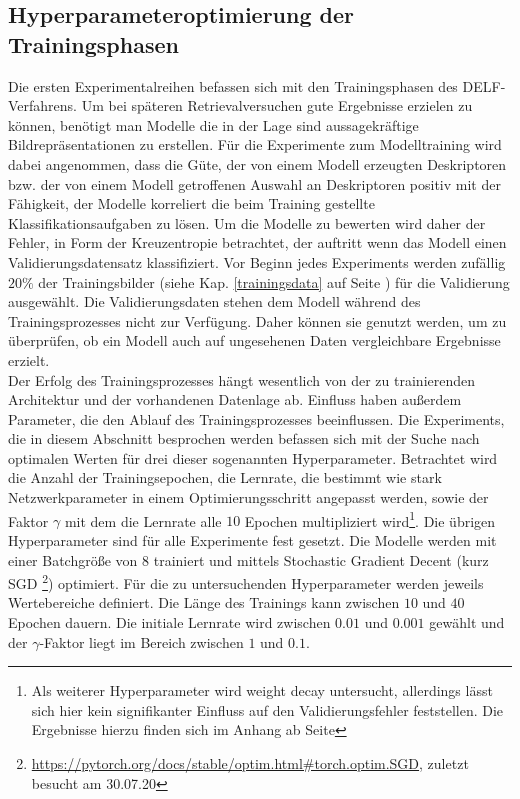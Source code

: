 \subsection{Hyperparameteroptimierung der Trainingsphasen}\label{hyperparam}
Die ersten Experimentalreihen befassen sich mit den Trainingsphasen des DELF-Verfahrens. Um bei späteren Retrievalversuchen gute Ergebnisse erzielen zu können, benötigt man Modelle die in der Lage sind aussagekräftige Bildrepräsentationen zu erstellen. Für die Experimente zum Modelltraining wird dabei angenommen, dass die Güte, der von einem Modell erzeugten Deskriptoren bzw. der von einem Modell getroffenen Auswahl an Deskriptoren positiv mit der Fähigkeit, der Modelle korreliert die beim Training gestellte Klassifikationsaufgaben zu lösen. Um die Modelle zu bewerten wird daher der Fehler, in Form der Kreuzentropie betrachtet, der auftritt wenn das Modell einen Validierungsdatensatz klassifiziert. Vor Beginn jedes Experiments werden zufällig $20\%$ der Trainingsbilder (siehe Kap. \ref{trainingsdata} auf Seite \pageref{trainingsdata}) für die Validierung ausgewählt. Die Validierungsdaten stehen dem Modell während des Trainingsprozesses nicht zur Verfügung. Daher können sie genutzt werden, um zu überprüfen, ob ein Modell auch auf ungesehenen Daten vergleichbare Ergebnisse erzielt.
\\
Der Erfolg des Trainingsprozesses hängt wesentlich von der zu trainierenden Architektur und der vorhandenen Datenlage ab. Einfluss haben außerdem Parameter, die den Ablauf des Trainingsprozesses beeinflussen. Die Experiments, die in diesem Abschnitt besprochen werden befassen sich mit der Suche nach optimalen Werten für drei dieser sogenannten Hyperparameter. Betrachtet wird die Anzahl der Trainingsepochen, die Lernrate, die bestimmt wie stark Netzwerkparameter in einem Optimierungsschritt angepasst werden, sowie der Faktor $\gamma$ mit dem die Lernrate alle $10$ Epochen multipliziert wird\footnote{Als weiterer Hyperparameter wird weight decay untersucht, allerdings lässt sich hier kein signifikanter Einfluss auf den Validierungsfehler feststellen. Die Ergebnisse hierzu finden sich im Anhang ab Seite \pageref{weight_decay}}. Die übrigen Hyperparameter sind für alle Experimente fest gesetzt. Die Modelle werden mit einer Batchgröße von $8$ trainiert und mittels Stochastic Gradient Decent (kurz SGD \footnote{\url{https://pytorch.org/docs/stable/optim.html\#torch.optim.SGD}, zuletzt besucht am 30.07.20}) optimiert. Für die zu untersuchenden Hyperparameter werden jeweils Wertebereiche definiert. Die Länge des Trainings kann zwischen $10$ und $40$ Epochen dauern. Die initiale Lernrate wird zwischen $0.01$ und $0.001$ gewählt und der $\gamma$-Faktor liegt im Bereich zwischen $1$ und $0.1$.
